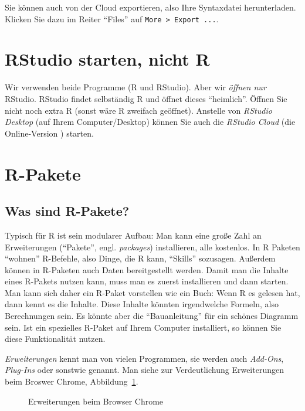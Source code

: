 \documentclass[
  letterpaper,
]{scrbook}
\theoremstyle{definition}
\theoremstyle{definition}
\theoremstyle{definition}
\theoremstyle{remark}
\begin{document}
Sie können auch von der Cloud exportieren, also Ihre Syntaxdatei
herunterladen. Klicken Sie dazu im Reiter ``Files'' auf
\texttt{More\ \textgreater{}\ Export\ ...}.

\section{RStudio starten, nicht R}\label{rstudio-starten-nicht-r}

Wir verwenden beide Programme (R und RStudio). Aber wir \emph{öffnen
nur} RStudio. RStudio findet selbständig R und öffnet dieses
``heimlich''. Öffnen Sie nicht noch extra R (sonst wäre R zweifach
geöffnet). Anstelle von \emph{RStudio Desktop} (auf Ihrem
Computer/Desktop) können Sie auch die \emph{RStudio Cloud} (die
Online-Version ) starten.

\section{R-Pakete}\label{r-pakete}

\subsection{Was sind R-Pakete?}\label{was-sind-r-pakete}

Typisch für R ist sein modularer Aufbau: Man kann eine große Zahl an
Erweiterungen (``Pakete'', engl. \emph{packages}) installieren, alle
kostenlos. In R Paketen ``wohnen'' R-Befehle, also Dinge, die R kann,
``Skills'' sozusagen. Außerdem können in R-Paketen auch Daten
bereitgestellt werden. Damit man die Inhalte eines R-Pakets nutzen kann,
muss man es zuerst installieren und dann starten. Man kann sich daher
ein R-Paket vorstellen wie ein Buch: Wenn R es gelesen hat, dann kennt
es die Inhalte. Diese Inhalte könnten irgendwelche Formeln, also
Berechnungen sein. Es könnte aber die ``Bauanleitung'' für ein schönes
Diagramm sein. Ist ein spezielles R-Paket auf Ihrem Computer
installiert, so können Sie diese Funktionalität nutzen.

\emph{Erweiterungen} kennt man von vielen Programmen, sie werden auch
\emph{Add-Ons}, \emph{Plug-Ins} oder sonstwie genannt. Man siehe zur
Verdeutlichung Erweiterungen beim Broswer Chrome,
Abbildung~\ref{fig-chrome}.

\begin{figure}


\caption{\label{fig-chrome}Erweiterungen beim Browser Chrome}

\end{figure}%
\end{document}
